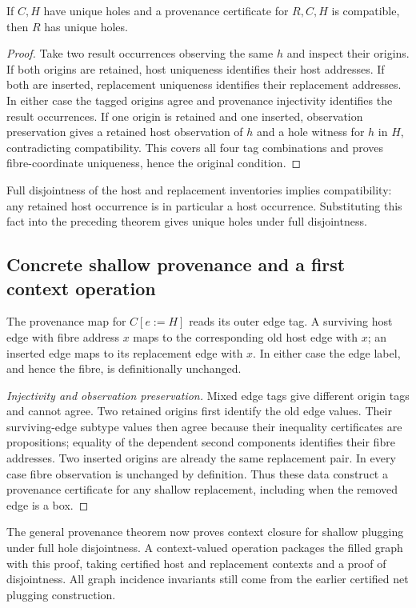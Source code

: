 \begin{theorem}
If $C,H$ have unique holes and a provenance certificate for $R,C,H$ is compatible,
then $R$ has unique holes.
\end{theorem}
\begin{proof}
Take two result occurrences observing the same $h$ and inspect their origins.
If both origins are retained, host uniqueness identifies their host addresses.
If both are inserted, replacement uniqueness identifies their replacement
addresses. In either case the tagged origins agree and provenance injectivity
identifies the result occurrences. If one origin is retained and one inserted,
observation preservation gives a retained host observation of $h$ and a hole
witness for $h$ in $H$, contradicting compatibility. This covers all four tag
combinations and proves fibre-coordinate uniqueness, hence the original condition.
\end{proof}
Full disjointness of the host and replacement inventories implies compatibility:
any retained host occurrence is in particular a host occurrence. Substituting
this fact into the preceding theorem gives unique holes under full disjointness.

\subsection{Concrete shallow provenance and a first context operation}
The provenance map for $C[e:=H]$ reads its outer edge tag. A surviving host edge
with fibre address $x$ maps to the corresponding old host edge with $x$;
an inserted edge maps to its replacement edge with $x$. In either case the
edge label, and hence the fibre, is definitionally unchanged.
\begin{proof}[Injectivity and observation preservation]
Mixed edge tags give different origin tags and cannot agree. Two retained
origins first identify the old edge values. Their surviving-edge subtype values
then agree because their inequality certificates are propositions; equality of
the dependent second components identifies their fibre addresses. Two inserted
origins are already the same replacement pair. In every case fibre observation
is unchanged by definition. Thus these data construct a provenance certificate
for any shallow replacement, including when the removed edge is a box.
\end{proof}
The general provenance theorem now proves context closure for shallow plugging
under full hole disjointness. A context-valued operation packages the filled
graph with this proof, taking certified host and replacement contexts and a
proof of disjointness. All graph incidence invariants still come from the earlier
certified net plugging construction.

